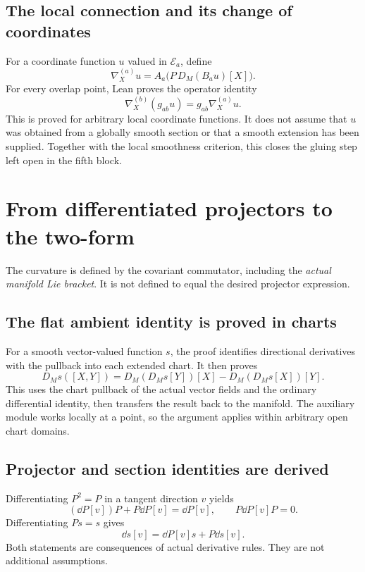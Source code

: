 \subsection{The local connection and its change of coordinates}
For a coordinate function $u$ valued in $\mathcal E_a$, define
\[
\nabla^{(a)}_Xu=A_a\bigl(P\,D_M(B_a u)[X]\bigr).
\]
For every overlap point, Lean proves the operator identity
\[
\boxed{\nabla^{(b)}_X(g_{ab}u)=g_{ab}\nabla^{(a)}_Xu.}
\]
This is proved for arbitrary local coordinate functions. It does not assume that $u$ was obtained from a globally smooth section or that a smooth extension has been supplied. Together with the local smoothness criterion, this closes the gluing step left open in the fifth block.





\section{From differentiated projectors to the two-form}\label{supp6:section:004}
The curvature is defined by the covariant commutator, including the \emph{actual manifold Lie bracket}. It is not defined to equal the desired projector expression.

\subsection{The flat ambient identity is proved in charts}
For a smooth vector-valued function $s$, the proof identifies directional derivatives with the pullback into each extended chart. It then proves
\[
D_Ms([X,Y])=D_M(D_Ms[Y])[X]-D_M(D_Ms[X])[Y].
\]
This uses the chart pullback of the actual vector fields and the ordinary differential identity, then transfers the result back to the manifold. The auxiliary module works locally at a point, so the argument applies within arbitrary open chart domains.

\subsection{Projector and section identities are derived}
Differentiating $P^2=P$ in a tangent direction $v$ yields
\[
(\dd P[v])P+P\dd P[v]=\dd P[v],
\qquad P\dd P[v]P=0.
\]
Differentiating $Ps=s$ gives
\[
\dd s[v]=\dd P[v]s+P\dd s[v].
\]
Both statements are consequences of actual derivative rules. They are not additional assumptions.

